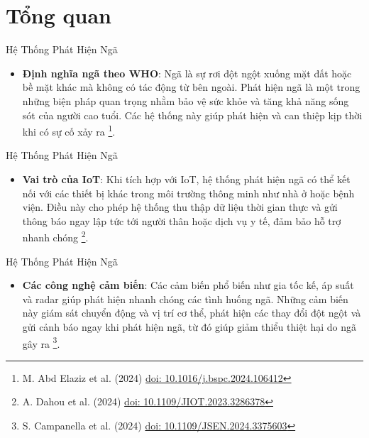 \documentclass{beamer}
\newcommand*{\doi}[1]{\href{http://dx.doi.org/#1}{doi: #1}}
\begin{document}
\section{Tổng quan}
\begin{frame}{Hệ Thống Phát Hiện Ngã}
    \begin{itemize}
    \item \textbf{Định nghĩa ngã theo WHO}: Ngã là sự rơi đột ngột xuống mặt đất hoặc bề mặt khác mà không có tác động từ bên ngoài. Phát hiện ngã là một trong những biện pháp quan trọng nhằm bảo vệ sức khỏe và tăng khả năng sống sót của người cao tuổi. Các hệ thống này giúp phát hiện và can thiệp kịp thời khi có sự cố xảy ra \footnote{M. Abd Elaziz et al. (2024) \doi{10.1016/j.bspc.2024.106412}}.
    \end{itemize}
    
\end{frame}

\begin{frame}{Hệ Thống Phát Hiện Ngã}

    \begin{itemize}
    \item \textbf{Vai trò của IoT}: Khi tích hợp với IoT, hệ thống phát hiện ngã có thể kết nối với các thiết bị khác trong môi trường thông minh như nhà ở hoặc bệnh viện. Điều này cho phép hệ thống thu thập dữ liệu thời gian thực và gửi thông báo ngay lập tức tới người thân hoặc dịch vụ y tế, đảm bảo hỗ trợ nhanh chóng \footnote{A. Dahou et al. (2024) \doi{10.1109/JIOT.2023.3286378}}.
    \end{itemize}
    
\end{frame}

\begin{frame}{Hệ Thống Phát Hiện Ngã}
    \begin{itemize}
    \item \textbf{Các công nghệ cảm biến}: Các cảm biến phổ biến như gia tốc kế, áp suất và radar giúp phát hiện nhanh chóng các tình huống ngã. Những cảm biến này giám sát chuyển động và vị trí cơ thể, phát hiện các thay đổi đột ngột và gửi cảnh báo ngay khi phát hiện ngã, từ đó giúp giảm thiểu thiệt hại do ngã gây ra \footnote{S. Campanella et al. (2024) \doi{10.1109/JSEN.2024.3375603}}.    
    \end{itemize}    
\end{frame}
\end{document}
